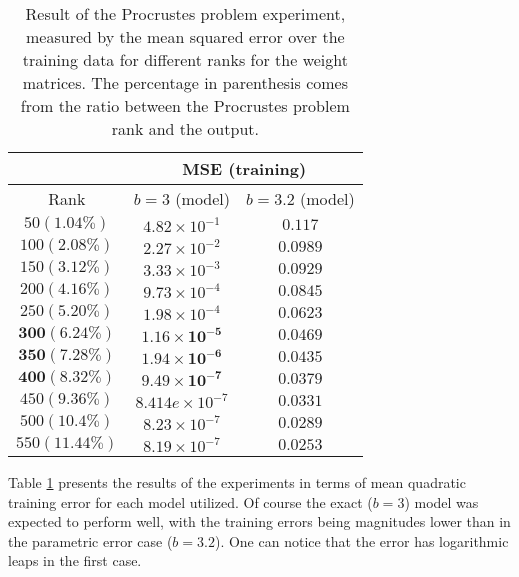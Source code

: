 \begin{table}[]
    \caption{Result of the Procrustes problem experiment, measured by the mean squared error over the training data for different ranks for the weight matrices. The percentage in parenthesis comes from the ratio between the Procrustes problem rank and the output.}
    \label{tab:procrustes_result}
    \centering
    \begin{tabular}{|c|c|c|}
      \cline{2-3}
    \multicolumn{1}{c}{}    & \multicolumn{2}{|c|}{MSE (training)} \\\hline
      Rank & $b = 3$ (model) & $b = 3.2$ (model) \\\hline
        $50 (1.04\%)$ & $4.82 \times 10^{-1}$ & $0.117$\\
        $100(2.08\%)$ & $2.27 \times 10^{-2}$ &$0.0989$\\
        $150(3.12\%)$ & $3.33 \times 10^{-3}$ &$0.0929$\\
        $200(4.16\%)$ & $9.73 \times 10^{-4}$ & $0.0845$\\
        $250(5.20\%)$ & $1.98 \times 10^{-4}$ & $0.0623$\\
        $\mathbf{300(6.24\%)}$ & $\mathbf{1.16\times 10^{-5}}$ & $\mathbf{0.0469}$\\
        $\mathbf{350(7.28\%)}$ & $\mathbf{1.94\times 10^{-6}}$ & $\mathbf{0.0435}$\\
        $\mathbf{400(8.32\%)}$ & $\mathbf{9.49\times 10^{-7}}$ & $\mathbf{0.0379}$\\
        $450(9.36\%)$ & $8.414e\times 10^{-7}$ & $0.0331$\\
        $500(10.4\%)$ & $8.23\times 10^{-7}$ & $0.0289$\\
        $550(11.44\%)$ & $8.19\times 10^{-7}$ & $0.0253$ \\
        \hline
    \end{tabular}

\end{table}


Table \ref{tab:procrustes_result} presents the results of the experiments in terms of mean quadratic training error for each model utilized.
%
Of course the exact ($b = 3$) model was expected to perform well, with the training errors being magnitudes lower than in the parametric error case ($b = 3.2$).
%
One can notice that the error has logarithmic leaps in the first case. 
%


